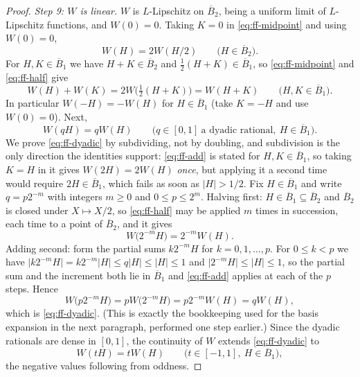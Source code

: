 \begin{proof}
\emph{Step 9: $W$ is linear.}
$W$ is $L$-Lipschitz on $\overline B_2$, being a uniform limit of $L$-Lipschitz
functions, and $W(0)=0$. Taking $K=0$ in \eqref{eq:ff-midpoint} and using
$W(0)=0$,
\begin{equation}\label{eq:ff-half}
  W(H)=2W(H/2)\qquad\bigl(H\in\overline B_2\bigr).
\end{equation}
For $H,K\in\overline B_1$ we have $H+K\in\overline B_2$ and
$\tfrac12(H+K)\in\overline B_1$, so \eqref{eq:ff-midpoint} and
\eqref{eq:ff-half} give
\begin{equation}\label{eq:ff-add}
  W(H)+W(K)=2W\bigl(\tfrac12(H+K)\bigr)=W(H+K)
  \qquad\bigl(H,K\in\overline B_1\bigr).
\end{equation}
In particular $W(-H)=-W(H)$ for $H\in\overline B_1$ (take $K=-H$ and use
$W(0)=0$). Next,
\begin{equation}\label{eq:ff-dyadic}
  W(qH)=qW(H)\qquad\bigl(q\in[0,1]\ \text{a dyadic rational},\
  H\in\overline B_1\bigr).
\end{equation}
We prove \eqref{eq:ff-dyadic} by subdividing, not by doubling, and subdivision
is the only direction the identities support: \eqref{eq:ff-add} is stated for
$H,K\in\overline B_1$, so taking $K=H$ in it gives $W(2H)=2W(H)$ \emph{once},
but applying it a second time would require $2H\in\overline B_1$, which fails as
soon as $|H|>1/2$. Fix $H\in\overline B_1$ and write $q=p2^{-m}$ with integers
$m\ge0$ and $0\le p\le2^m$. Halving first: $H\in\overline B_1\subseteq
\overline B_2$ and $\overline B_2$ is closed under $X\mapsto X/2$, so
\eqref{eq:ff-half} may be applied $m$ times in succession, each time to a point
of $\overline B_2$, and it gives
\[
  W\bigl(2^{-m}H\bigr)=2^{-m}W(H).
\]
Adding second: form the partial sums $k2^{-m}H$ for $k=0,1,\dots,p$. For
$0\le k<p$ we have $\bigl|k2^{-m}H\bigr|=k2^{-m}|H|\le q|H|\le|H|\le1$ and
$\bigl|2^{-m}H\bigr|\le|H|\le1$, so the partial sum and the increment both lie
in $\overline B_1$ and \eqref{eq:ff-add} applies at each of the $p$ steps. Hence
\[
  W\bigl(p2^{-m}H\bigr)=pW\bigl(2^{-m}H\bigr)=p2^{-m}W(H)=qW(H),
\]
which is \eqref{eq:ff-dyadic}. (This is exactly the bookkeeping used for the
basis expansion in the next paragraph, performed one step earlier.) Since the
dyadic rationals are dense in $[0,1]$, the continuity of $W$ extends
\eqref{eq:ff-dyadic} to
\begin{equation}\label{eq:ff-hom}
  W(tH)=tW(H)\qquad\bigl(t\in[-1,1],\ H\in\overline B_1\bigr),
\end{equation}
the negative values following from oddness.


\end{proof}

